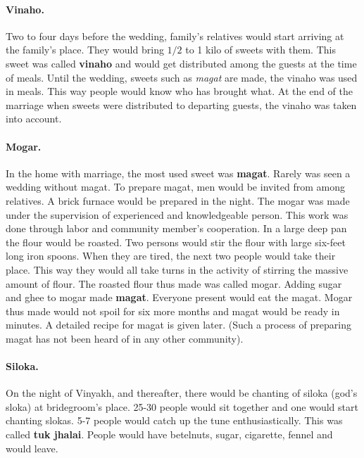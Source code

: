\paragraph{Vinaho.} Two to four days before the wedding, family's relatives
would start arriving at the family's place. They would bring $1/2$ to 1 kilo of
sweets with them. This sweet was called \textbf{vinaho} and would get
distributed among the guests at the time of meals. Until the wedding, sweets
such as \textit{magat} are made, the vinaho was used in meals. This way people
would know who has brought what. At the end of the marriage when sweets were
distributed to departing guests, the vinaho was taken into account.

\paragraph{Mogar.} In the home with marriage, the most used sweet was
\textbf{magat}. Rarely was seen a wedding without magat. To prepare magat, men
would be invited from among relatives. A brick furnace would be prepared in the
night. The mogar was made under the supervision of experienced and knowledgeable
person. This work was done through labor and community member's cooperation. In
a large deep pan the flour would be roasted. Two persons would stir the flour
with large six-feet long iron spoons. When they are tired, the next two people
would take their place. This way they would all take turns in the activity of
stirring the massive amount of flour. The roasted flour thus made was called
mogar. Adding sugar and ghee to mogar made \textbf{magat}. Everyone present
would eat the magat. Mogar thus made would not spoil for six more months and
magat would be ready in minutes. A detailed recipe for magat is given later.
(Such a process of preparing magat has not been heard of in any other
community).

\paragraph{Siloka.} On the night of Vinyakh, and thereafter, there would be
chanting of siloka (god's sloka) at bridegroom's place. 25-30 people would sit
together and one would start chanting slokas. 5-7 people would catch up the
tune enthusiastically. This was called \textbf{tuk jhalai}. People would have
betelnuts, sugar, cigarette, fennel and would leave.

